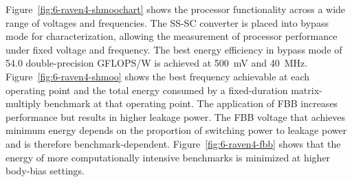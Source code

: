 \documentclass[graybox]{svmult}
\begin{document}
Figure~\ref{fig:6-raven4-shmoochart} shows the processor functionality across a wide range of voltages and frequencies.
The SS-SC converter is placed into bypass mode for characterization, allowing the measurement of processor performance under fixed voltage and frequency.
The best energy efficiency in bypass mode of 54.0 double-precision GFLOPS/W is achieved at \SI{500}{\milli\volt} and \SI{40}{\mega\hertz}.
Figure~\ref{fig:6-raven4-shmoo} shows the best frequency achievable at each operating point and the total energy consumed by a fixed-duration matrix-multiply benchmark at that operating point.
The application of FBB increases performance but results in higher leakage power.
The FBB voltage that achieves minimum energy depends on the proportion of switching power to leakage power and is therefore benchmark-dependent.
Figure~\ref{fig:6-raven4-fbb} shows that the energy of more computationally intensive benchmarks is minimized at higher body-bias settings.
\end{document}
